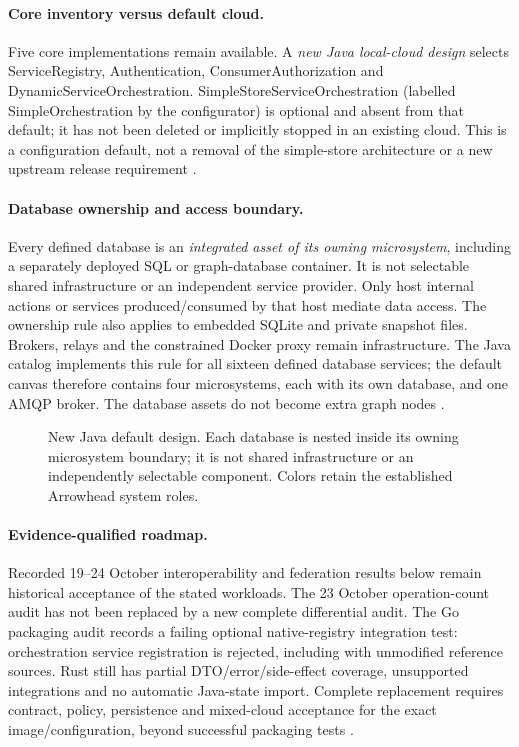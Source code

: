 \documentclass[a4paper]{arrowhead}
\begin{document}
\paragraph{Core inventory versus default cloud.}
Five core implementations remain available. A \emph{new Java local-cloud design}
selects ServiceRegistry, Authentication, ConsumerAuthorization and
DynamicServiceOrchestration. SimpleStoreServiceOrchestration (labelled
SimpleOrchestration by the configurator) is optional and absent from that default;
it has not been deleted or implicitly stopped in an existing cloud. This is a
configuration default, not a removal of the simple-store architecture or a new
upstream release requirement \cite{javaLocalCloud20261030}.

\paragraph{Database ownership and access boundary.}
Every defined database is an \emph{integrated asset of its owning microsystem},
including a separately deployed SQL or graph-database container. It is not
selectable shared infrastructure or an independent service provider. Only host
internal actions or services produced/consumed by that host mediate data access.
The ownership rule also applies to embedded SQLite and private snapshot files.
Brokers, relays and the constrained Docker proxy remain infrastructure. The
Java catalog implements this rule for all sixteen defined database services;
the default canvas therefore contains four microsystems, each with its own
database, and one AMQP broker. The database assets do not become extra graph
nodes \cite{javaDatabaseAssets20261030}.

\begin{figure}[htbp]
\centering

\caption{New Java default design. Each database is nested inside its owning
microsystem boundary; it is not shared infrastructure or an independently
selectable component. Colors retain the established Arrowhead system roles.}
\label{fig:default-owned-assets}
\end{figure}
\FloatBarrier

\paragraph{Evidence-qualified roadmap.}
Recorded 19--24 October interoperability and federation results below remain
historical acceptance of the stated workloads. The 23 October operation-count
audit has not been replaced by a new complete differential audit. The Go
packaging audit records a failing optional native-registry integration test:
orchestration service registration is rejected, including with unmodified
reference sources. Rust still has partial DTO/error/side-effect coverage,
unsupported integrations and no automatic Java-state import. Complete
replacement requires contract, policy, persistence and mixed-cloud acceptance
for the exact image/configuration, beyond successful packaging tests
\cite{goPackaging20261028,rustPackaging20261028,nativeCompatibility20261024}.
\end{document}
